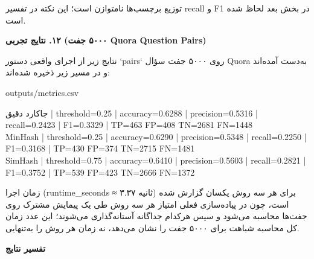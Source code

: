 \documentclass[11pt]{article}
\begin{document}
\noindent ‏توزیع برچسب‌ها نامتوازن است؛ این نکته در تفسیر recall و F1 در بخش بعد لحاظ شده است.\par

\medskip\noindent\hrulefill\medskip

\medskip
{\large\bfseries ‏۱۲. نتایج تجربی (۵۰۰۰ جفت Quora Question Pairs)}\medskip


\noindent ‏نتایج زیر از اجرای واقعی دستور `pairs` روی ۵۰۰۰ جفت سؤال Quora به‌دست آمده‌اند و در مسیر زیر ذخیره شده‌اند:\par

{\mycode
\begin{flushleft}
outputs/metrics.csv
\end{flushleft}}

{\mycode
\begin{flushleft}
جاکارد دقیق  | threshold=0.25 | accuracy=0.6288 | precision=0.5316 | recall=0.2423 | F1=0.3329 | TP=463 FP=408 TN=2681 FN=1448 \\
MinHash      | threshold=0.25 | accuracy=0.6290 | precision=0.5348 | recall=0.2250 | F1=0.3168 | TP=430 FP=374 TN=2715 FN=1481 \\
SimHash      | threshold=0.75 | accuracy=0.6410 | precision=0.5603 | recall=0.2821 | F1=0.3752 | TP=539 FP=423 TN=2666 FN=1372
\end{flushleft}}

\noindent ‏زمان اجرا (runtime\_seconds ≈ ۳.۳۷ ثانیه) برای هر سه روش یکسان گزارش شده است، چون در پیاده‌سازی فعلی امتیاز هر سه روش طی یک پیمایش مشترک روی جفت‌ها محاسبه می‌شود و سپس هرکدام جداگانه آستانه‌گذاری می‌شوند؛ این عدد زمان کل محاسبه شباهت برای ۵۰۰۰ جفت را نشان می‌دهد، نه زمان هر روش را به‌تنهایی.\par

\smallskip
{\bfseries ‏تفسیر نتایج}\smallskip
\end{document}
